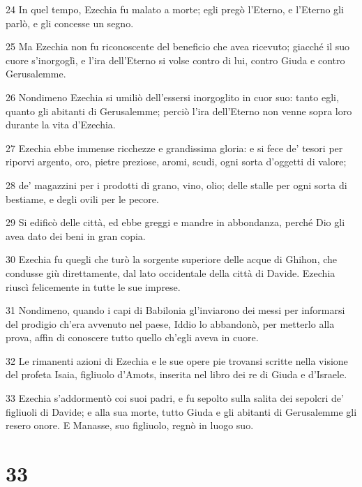 \par 24 In quel tempo, Ezechia fu malato a morte; egli pregò l'Eterno, e l'Eterno gli parlò, e gli concesse un segno.
\par 25 Ma Ezechia non fu riconoscente del beneficio che avea ricevuto; giacché il suo cuore s'inorgoglì, e l'ira dell'Eterno si volse contro di lui, contro Giuda e contro Gerusalemme.
\par 26 Nondimeno Ezechia si umiliò dell'essersi inorgoglito in cuor suo: tanto egli, quanto gli abitanti di Gerusalemme; perciò l'ira dell'Eterno non venne sopra loro durante la vita d'Ezechia.
\par 27 Ezechia ebbe immense ricchezze e grandissima gloria: e si fece de' tesori per riporvi argento, oro, pietre preziose, aromi, scudi, ogni sorta d'oggetti di valore;
\par 28 de' magazzini per i prodotti di grano, vino, olio; delle stalle per ogni sorta di bestiame, e degli ovili per le pecore.
\par 29 Si edificò delle città, ed ebbe greggi e mandre in abbondanza, perché Dio gli avea dato dei beni in gran copia.
\par 30 Ezechia fu quegli che turò la sorgente superiore delle acque di Ghihon, che condusse giù direttamente, dal lato occidentale della città di Davide. Ezechia riuscì felicemente in tutte le sue imprese.
\par 31 Nondimeno, quando i capi di Babilonia gl'inviarono dei messi per informarsi del prodigio ch'era avvenuto nel paese, Iddio lo abbandonò, per metterlo alla prova, affin di conoscere tutto quello ch'egli aveva in cuore.
\par 32 Le rimanenti azioni di Ezechia e le sue opere pie trovansi scritte nella visione del profeta Isaia, figliuolo d'Amots, inserita nel libro dei re di Giuda e d'Israele.
\par 33 Ezechia s'addormentò coi suoi padri, e fu sepolto sulla salita dei sepolcri de' figliuoli di Davide; e alla sua morte, tutto Giuda e gli abitanti di Gerusalemme gli resero onore. E Manasse, suo figliuolo, regnò in luogo suo.

\chapter{33}

